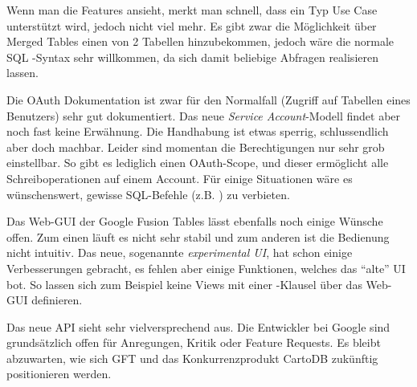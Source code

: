 Wenn man die Features ansieht, merkt man schnell, dass ein Typ Use Case unterstützt wird, jedoch nicht viel mehr. Es gibt zwar die Möglichkeit über Merged Tables einen  von 2 Tabellen hinzubekommen, jedoch wäre die normale SQL -Syntax sehr willkommen, da sich damit beliebige Abfragen realisieren lassen. 

Die \gls{OAuth} Dokumentation ist zwar für den Normalfall (Zugriff auf Tabellen eines Benutzers) sehr gut dokumentiert. Das neue \emph{Service Account}-Modell findet aber noch fast keine Erwähnung. Die Handhabung ist etwas sperrig, schlussendlich aber doch machbar. Leider sind momentan die Berechtigungen nur sehr grob einstellbar. So gibt es lediglich einen \gls{OAuth}-Scope, und dieser ermöglicht alle Schreiboperationen auf einem Account. Für einige Situationen wäre es wünschenswert, gewisse SQL-Befehle (z.B. ) zu verbieten.

Das Web-GUI der Google Fusion Tables lässt ebenfalls noch einige Wünsche offen. Zum einen läuft es nicht sehr stabil und zum anderen ist die Bedienung nicht intuitiv. Das neue, sogenannte \emph{experimental UI}, hat schon einige Verbesserungen gebracht, es fehlen aber einige Funktionen, welches das "`alte"' UI bot. So lassen sich zum Beispiel keine Views mit einer -Klausel über das Web-GUI definieren. 

Das neue \gls{API} sieht sehr vielversprechend aus. Die Entwickler bei Google sind grundsätzlich offen für Anregungen, Kritik oder Feature Requests. Es bleibt abzuwarten, wie sich GFT und das Konkurrenzprodukt CartoDB zukünftig positionieren werden.